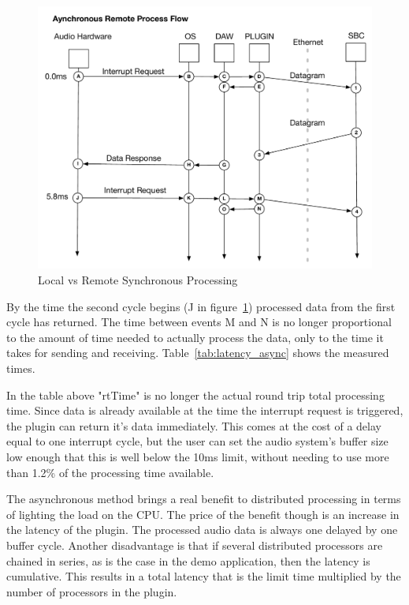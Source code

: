 \begin{figure}[H]
    \centering
    \includegraphics[width=\textwidth]{assets/conclusion/async_flow.pdf}
    \caption{Local vs Remote Synchronous Processing}
    \label{fig:async_remote}
\end{figure}

By the time the second cycle begins (J in figure~\ref{fig:async_remote}) processed data from the first cycle has returned. The time between events M and N is no longer proportional to the amount of time needed to actually process the data, only to the time it takes for sending and receiving. Table~\ref{tab:latency_async} shows the measured times.



In the table above "rtTime" is no longer the actual round trip total processing time. Since data is already available at the time the interrupt request is triggered, the plugin can return it's data immediately. This comes at the cost of a delay equal to one interrupt cycle, but the user can set the audio system's buffer size low enough that this is well below the 10ms limit, without needing to use more than 1.2\% of the processing time available.

The asynchronous method brings a real benefit to distributed processing in terms of lighting the load on the CPU. The price of the benefit though is an increase in the latency of the plugin. The processed audio data is always one delayed by one buffer cycle. Another disadvantage is that if several distributed processors are chained in series, as is the case in the demo application, then the latency is cumulative. This results in a total latency that is the limit time multiplied by the number of processors in the plugin.

